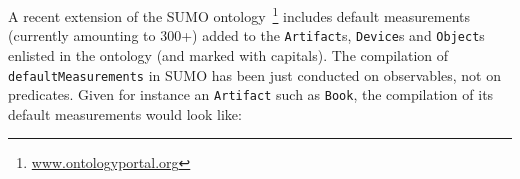 \documentclass[11pt]{article}
\begin{document}



A recent extension of the SUMO ontology~\cite[Suggested Upper Merged Ontology]{nilespease2001sumo}\footnote{\url{www.ontologyportal.org}} includes
default measurements (currently amounting to 300+) added to the \texttt{Artifact}s, \texttt{Device}s and \texttt{Object}s enlisted in the ontology (and marked with capitals).
The compilation of \texttt{defaultMeasurements} in SUMO has been just conducted on observables, not on predicates. Given for instance an \texttt{Artifact} such as \texttt{Book}, the compilation of its default measurements would look like:
\end{document}
